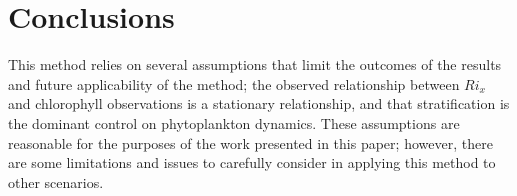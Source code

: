 \documentclass[preprint,review,12pt]{elsarticle}
\begin{document}
\section{Conclusions}\label{S:conclusion}


This method relies on several assumptions that limit the outcomes of the results and future applicability of the method; the observed relationship between \(Ri_x\) and chlorophyll observations is a stationary relationship, and that stratification is the dominant control on phytoplankton dynamics. These assumptions are reasonable for the purposes of the work presented in this paper; however, there are some limitations and issues to carefully consider in applying this method to other scenarios. 













\end{document}
